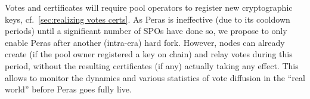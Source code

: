 Votes and certificates will require pool operators to register new cryptographic keys, cf.\ \cref{sec:realizing votes certs}.
As Peras is ineffective (due to its cooldown periods) until a significant number of SPOs have done so, we propose to only enable Peras after another (intra-era) hard fork.
However, nodes can already create (if the pool owner registered a key on chain) and relay votes during this period, without the resulting certificates (if any) actually taking any effect.
This allows to monitor the dynamics and various statistics of vote diffusion in the \enquote{real world} before Peras goes fully live.


